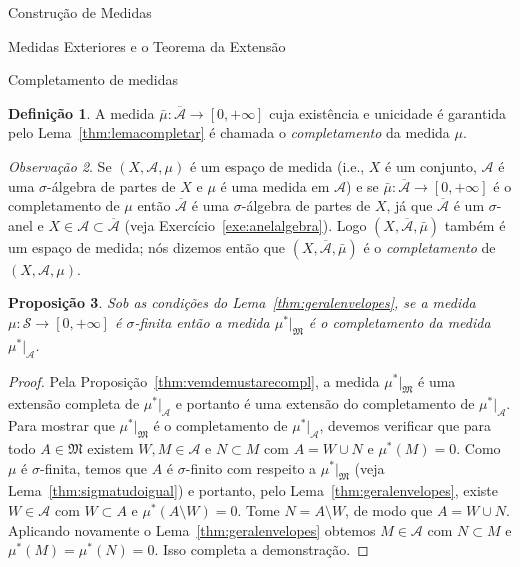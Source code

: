 \documentclass[oneside,final,11pt]{amsbook}
\theoremstyle{remark}\newtheorem{exercise}{Exercício}[chapter]
\theoremstyle{remark}\newtheorem{*exercise}[exercise]{\hbox to 0pt{\hskip 0pt minus 1fil*}Exercício}
\theoremstyle{definition}\newtheorem{exdefin}{Definição}[chapter]
\theoremstyle{plain}\newtheorem{teo}{Teorema}[section]
\theoremstyle{plain}\newtheorem{lem}[teo]{Lema}
\theoremstyle{plain}\newtheorem{prop}[teo]{Proposição}
\theoremstyle{plain}\newtheorem{cor}[teo]{Corolário}
\theoremstyle{definition}\newtheorem{defin}[teo]{Definição}
\theoremstyle{remark}\newtheorem{rem}[teo]{Observação}
\theoremstyle{definition}\newtheorem{notation}[teo]{Notação}
\theoremstyle{definition}\newtheorem{convention}[teo]{Convenção}
\theoremstyle{definition}\newtheorem{example}[teo]{Exemplo}
\numberwithin{section}{chapter}
\numberwithin{equation}{section}
\begin{document}
\begin{chapter}{Construção de Medidas}
\begin{section}{Medidas Exteriores e o Teorema da Extensão}
\begin{subsection}{Completamento de medidas}
\begin{defin}
A medida $\bar\mu:\overline{\mathcal A}\to[0,+\infty]$ cuja existência e unicidade
é garantida pelo Lema~\ref{thm:lemacompletar} é chamada o
{\em completamento\/}
da medida $\mu$.
\end{defin}

\begin{rem}
Se $(X,\mathcal A,\mu)$ é um espaço de medida (i.e., $X$ é um conjunto,
$\mathcal A$ é uma $\sigma$-álgebra de partes de $X$ e $\mu$ é uma medida em $\mathcal A$)
e se $\bar\mu:\overline{\mathcal A}\to[0,+\infty]$
é o completamento de $\mu$ então $\overline{\mathcal A}$ é uma $\sigma$-álgebra de partes
de $X$, já que $\overline{\mathcal A}$ é um $\sigma$-anel e $X\in\mathcal A\subset\overline{\mathcal A}$
(veja Exercício~\ref{exe:anelalgebra}). Logo $(X,\overline{\mathcal A},\bar\mu)$ também é um espaço de medida;
nós dizemos então que $(X,\overline{\mathcal A},\bar\mu)$ é o
{\em completamento\/}%
 de $(X,\mathcal A,\mu)$.
\end{rem}

\begin{prop}\label{thm:nofrakMcompletamento}
Sob as condições do Lema~\ref{thm:geralenvelopes}, se a medida $\mu:\mathcal S\to[0,+\infty]$ é
$\sigma$-finita então a medida $\mu^*\vert_{\mathfrak M}$ é o completamento
da medida $\mu^*\vert_{\mathcal A}$.
\end{prop}
\begin{proof}
Pela Proposição~\ref{thm:vemdemustarecompl}, a medida $\mu^*\vert_{\mathfrak M}$ é
uma extensão completa de $\mu^*\vert_{\mathcal A}$ e portanto é uma extensão
do completamento de $\mu^*\vert_{\mathcal A}$. Para mostrar que $\mu^*\vert_{\mathfrak M}$
é o completamento de $\mu^*\vert_{\mathcal A}$, devemos verificar que para todo
$A\in\mathfrak M$ existem $W,M\in\mathcal A$ e $N\subset M$ com $A=W\cup N$
e $\mu^*(M)=0$. Como $\mu$ é $\sigma$-finita, temos que $A$ é $\sigma$-finito
com respeito a $\mu^*\vert_{\mathfrak M}$ (veja Lema~\ref{thm:sigmatudoigual}) e portanto,
pelo Lema~\ref{thm:geralenvelopes}, existe $W\in\mathcal A$ com $W\subset A$
e $\mu^*(A\setminus W)=0$. Tome $N=A\setminus W$, de modo que $A=W\cup N$.
Aplicando novamente o Lema~\ref{thm:geralenvelopes} obtemos $M\in\mathcal A$ com
$N\subset M$ e $\mu^*(M)=\mu^*(N)=0$. Isso completa a demonstração.
\end{proof}


\end{subsection}
\end{section}
\end{chapter}
\end{document}
